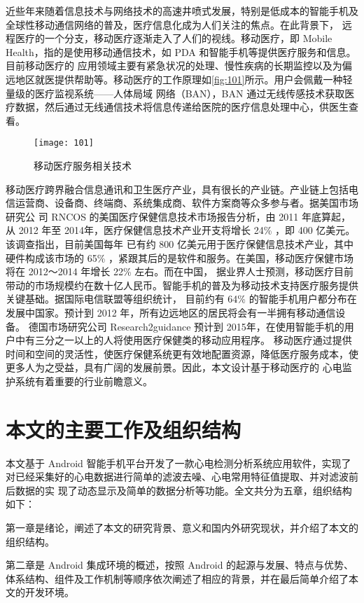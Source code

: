 近些年来随着信息技术与网络技术的高速井喷式发展，特别是低成本的智能手机及全球性移动通信网络的普及，医疗信息化成为人们关注的焦点。在此背景下，
远程医疗的一个分支，移动医疗逐渐走入了人们的视线\cite{2}。移动医疗，即 Mobile Health，指的是使用移动通信技术，如 PDA 和智能手机等提供医疗服务和信息。目前移动医疗的
应用领域主要有紧急状况的处理、慢性疾病的长期监控以及为偏远地区就医提供帮助等。移动医疗的工作原理如\autoref{fig:101}所示。用户会佩戴一种轻量级的医疗监视系统——人体局域
网络（BAN），BAN 通过无线传感技术获取医疗数据，然后通过无线通信技术将信息传递给医院的医疗信息处理中心，供医生查看。

\begin{figure}[htbp]
    \centering
    \texttt{[image: 101]}
    \caption{\label{fig:101}移动医疗服务相关技术}
\end{figure}

移动医疗跨界融合信息通讯和卫生医疗产业，具有很长的产业链\cite{3}。产业链上包括电信运营商、设备商、终端商、系统集成商、软件方案商等众多参与者。据美国市场研究公
司 RNCOS 的美国医疗保健信息技术市场报告分析，由 2011 年底算起，从 2012 年至 2014年，医疗保健信息技术产业开支将增长 24\% ，即 400 亿美元。该调查指出，目前美国每年
已有约 800 亿美元用于医疗保健信息技术产业，其中硬件构成该市场的 65\% ，紧跟其后的是软件和服务。在美国，移动医疗保健市场将在 2012～2014 年增长 22\% 左右。而在中国，
据业界人士预测，移动医疗目前带动的市场规模约在数十亿人民币。智能手机的普及为移动技术支持医疗服务提供关键基础。据国际电信联盟等组织统计，
目前约有 64\% 的智能手机用户都分布在发展中国家。预计到 2012 年，所有边远地区的居民将会有一半拥有移动通信设备。
德国市场研究公司 Research2guidance 预计到 2015年，在使用智能手机的用户中有三分之一以上的人将使用医疗保健类的移动应用程序。
移动医疗通过提供时间和空间的灵活性，使医疗保健系统更有效地配置资源，降低医疗服务成本，使更多人为之受益，具有广阔的发展前景。因此，本文设计基于移动医疗的
心电监护系统有着重要的行业前瞻意义。

\section{本文的主要工作及组织结构}
本文基于 Android 智能手机平台开发了一款心电检测分析系统应用软件，实现了对已经采集好的心电数据进行简单的滤波去噪、心电常用特征值提取、并对滤波前后数据的实
现了动态显示及简单的数据分析等功能。全文共分为五章，组织结构如下：

第一章是绪论，阐述了本文的研究背景、意义和国内外研究现状，并介绍了本文的组织结构。

第二章是 Android 集成环境的概述，按照 Android 的起源与发展、特点与优势、体系结构、组件及工作机制等顺序依次阐述了相应的背景，并在最后简单介绍了本文的开发环境。

